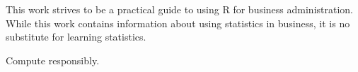 %
%
%
%
%

This work strives to be a practical guide to using R for business 
administration. While this work contains information about using statistics in business, it is no substitute for learning statistics.

Compute responsibly.